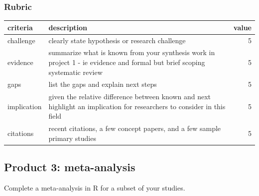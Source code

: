 \documentclass[
]{book}
\begin{document}
\hypertarget{rubric-1}{%
\subsubsection*{Rubric}\label{rubric-1}}

\begin{tabular}{llr}
\toprule
criteria & description & value\\
\midrule
challenge & clearly state hypothesis or research challenge & 5\\
evidence & summarize what is known from your synthesis work in project 1 - ie evidence and formal but brief scoping systematic review & 5\\
gaps & list the gaps and explain next steps & 5\\
implication & given the relative difference between known and next highlight an implication for researchers to consider in this field & 5\\
citations & recent citations, a few concept papers, and a few sample primary studies & 5\\
\bottomrule
\end{tabular}

\hypertarget{product-3-meta-analysis}{%
\subsection*{Product 3: meta-analysis}\label{product-3-meta-analysis}}

Complete a meta-analysis in R for a subset of your studies.
\end{document}

